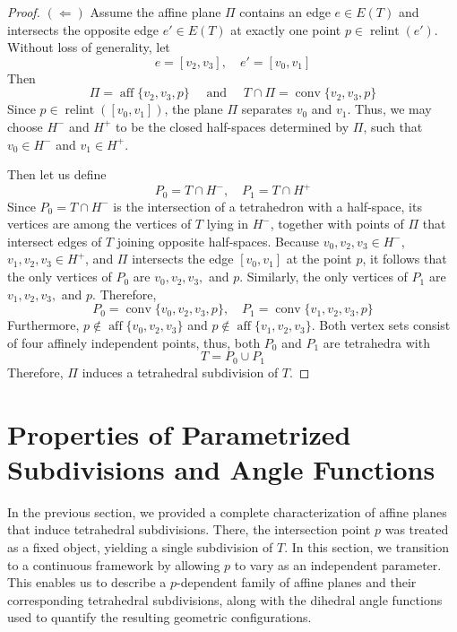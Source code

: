 \documentclass{mainresearch}
\begin{document}
\begin{proof}
	
	
	$(\Leftarrow)$ Assume the affine plane $\Pi$ contains an edge $e \in E(T)$ and intersects the opposite edge $e' \in E(T)$ at exactly one point $p \in \operatorname{relint}(e')$. Without loss of generality, let
	\begin{equation*}
		e = [v_2,v_3], \quad e' = [v_0,v_1]
	\end{equation*}
	Then
	\begin{equation*}
		\Pi = \operatorname{aff}\{v_2,v_3,p\} \quad \text{ and } \quad T\cap \Pi = \operatorname{conv}\{v_2,v_3,p\}
	\end{equation*}
	Since $p \in \operatorname{relint}([v_0,v_1])$, the plane $\Pi$ separates $v_0$ and $v_1$. Thus, we may choose $H^-$ and $H^+$ to be the closed half-spaces determined by $\Pi$, such that $v_0 \in H^-$ and $v_1 \in H^+$. 
	
	Then let us define 
	\begin{equation*}
		P_0 = T \cap H^-, \quad P_1 = T \cap H^+
	\end{equation*}
	Since $P_0 = T \cap H^-$ is the intersection of a tetrahedron with a half-space, its vertices are among the vertices of $T$ lying in $H^-$, together with points of $\Pi$ that intersect edges of $T$ joining opposite half-spaces. Because $v_0,v_2,v_3 \in H^-$, $v_1, v_2,v_3 \in H^+$, and $\Pi$ intersects the edge $[v_0,v_1]$ at the point $p$, it follows that the only vertices of $P_0$ are $v_0,v_2,v_3,$ and $p$. Similarly, the only vertices of $P_1$ are $v_1,v_2,v_3,$ and $p$. Therefore,
	\begin{equation*}
		P_0 = \operatorname{conv}\{v_0,v_2,v_3,p\}, \quad P_1 = \operatorname{conv}\{v_1,v_2,v_3,p\}
	\end{equation*}
	Furthermore, $p \not \in \operatorname{aff}\{v_0,v_2,v_3\}$ and $p \notin \operatorname{aff}\{v_1,v_2,v_3\}$. Both vertex sets consist of four affinely independent  points, thus, both $P_0$ and $P_1$ are tetrahedra with 
	\begin{equation*}
		T = P_0 \cup P_1
	\end{equation*}
	Therefore, $\Pi$ induces a tetrahedral subdivision of $T$.
\end{proof}

\section{Properties of Parametrized Subdivisions and Angle Functions}\label{anglefunction}
In the previous section, we provided a complete characterization of affine planes that induce tetrahedral subdivisions. There, the intersection point $p$ was treated as a fixed object, yielding a single subdivision of $T$. In this section, we transition to a continuous framework by allowing $p$ to vary as an independent parameter. This enables us to describe a $p$-dependent family of affine planes and their corresponding tetrahedral subdivisions, along with the dihedral angle functions used to quantify the resulting geometric configurations.
\end{document}
